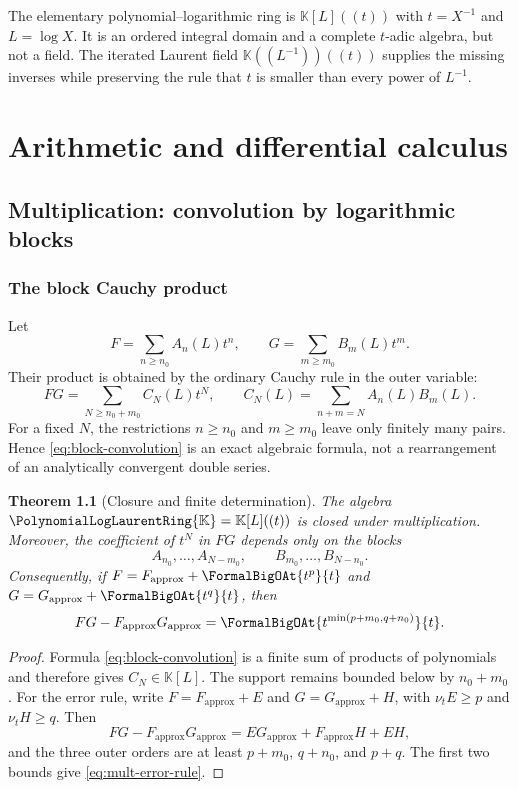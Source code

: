 \documentclass[11pt,oneside]{book}
\newtheorem{theorem}{Theorem}[chapter]
\theoremstyle{definition}
\theoremstyle{remark}
\newcommand{\K}{\mathbb K}
\newcommand{\PLpoly}{\PolynomialLogLaurentRing{\K}}
\newcommand{\ApproximationOf}[1]{#1_{\mathrm{approx}}}
\begin{document}
\begin{summarybox}
The elementary polynomial--logarithmic ring is $\K[L]((t))$ with
$t=X^{-1}$ and $L=\log X$.  It is an ordered integral domain and a complete
$t$-adic algebra, but not a field.  The iterated Laurent field
$\K((L^{-1}))((t))$ supplies the missing inverses while preserving the rule
that $t$ is smaller than every power of $L^{-1}$.
\end{summarybox}

\part{Arithmetic and differential calculus}

\chapter{Multiplication: convolution by logarithmic blocks}
\label{ch:multiplication}

\section{The block Cauchy product}
Let
\begin{equation}\label{eq:FG-blocks}
 F=\sum_{n\ge n_0}A_n(L)t^n,
 \qquad
 G=\sum_{m\ge m_0}B_m(L)t^m.
\end{equation}
Their product is obtained by the ordinary Cauchy rule in the outer variable:
\begin{equation}\label{eq:block-convolution}
 FG=\sum_{N\ge n_0+m_0}C_N(L)t^N,
 \qquad
 C_N(L)=\sum_{n+m=N}A_n(L)B_m(L).
\end{equation}
For a fixed $N$, the restrictions $n\ge n_0$ and $m\ge m_0$ leave only
finitely many pairs.  Hence \eqref{eq:block-convolution} is an exact algebraic
formula, not a rearrangement of an analytically convergent double series.

\begin{theorem}[Closure and finite determination]\label{thm:mult-closure}
The algebra $\PLpoly=\K[L]((t))$ is closed under multiplication.  Moreover,
the coefficient of $t^N$ in $FG$ depends only on the blocks
\[
 A_{n_0},\ldots,A_{N-m_0},
 \qquad
 B_{m_0},\ldots,B_{N-n_0}.
\]
Consequently, if
$F=\ApproximationOf{F}+\FormalBigOAt{t^{p}}{t}$ and
$G=\ApproximationOf{G}+\FormalBigOAt{t^{q}}{t}$, then
\begin{equation}\label{eq:mult-error-rule}
 FG-\ApproximationOf{F}\ApproximationOf{G}
 =\FormalBigOAt{t^{\min(p+m_0,q+n_0)}}{t}.
\end{equation}
\end{theorem}
\begin{proof}
Formula \eqref{eq:block-convolution} is a finite sum of products of
polynomials and therefore gives $C_N\in\K[L]$.  The support remains bounded
below by $n_0+m_0$.  For the error rule, write
$F=\ApproximationOf{F}+E$ and $G=\ApproximationOf{G}+H$, with
$\nu_tE\ge p$ and $\nu_tH\ge q$.  Then
\[
 FG-\ApproximationOf{F}\ApproximationOf{G}=E\ApproximationOf{G}+\ApproximationOf{F} H+EH,
\]
and the three outer orders are at least $p+m_0$, $q+n_0$, and $p+q$.
The first two bounds give \eqref{eq:mult-error-rule}.
\end{proof}
\end{document}

